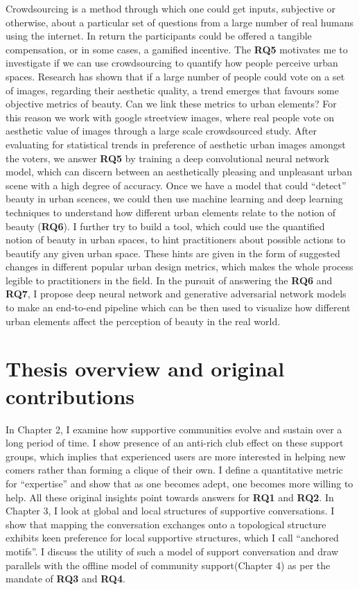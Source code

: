 Crowdsourcing is a method through which one could get inputs, subjective or otherwise, about a particular set of questions from a large number of real humans using the internet. In return the participants could be offered a tangible compensation, or in some cases, a gamified incentive. 
The \textbf{RQ5} motivates me to investigate if we can use crowdsourcing to quantify how people perceive urban spaces. Research has shown that if a large number of people could vote on a set of images, regarding their aesthetic quality, a trend emerges that favours some objective metrics of beauty\cite{datta2008algorithmic,612644,quercia2014aesthetic}. Can we link these metrics to urban elements? For this reason we work with google streetview images, where real people vote on aesthetic value of images through a large scale crowdsourced study. After evaluating for statistical trends in preference of aesthetic urban images amongst the voters, we answer \textbf{RQ5} by training a deep convolutional neural network model, which can discern between an aesthetically pleasing and unpleasant urban scene with a high degree of accuracy. Once we have a model that could ``detect'' beauty in urban scences, we could then use machine learning and deep learning techniques to understand how different urban elements relate to the notion of beauty (\textbf{RQ6}). I further try to build a tool, which could use the quantified notion of beauty in urban spaces, to hint practitioners about possible actions to beautify any given urban space. These hints are given in the form of suggested changes in different popular urban design metrics, which makes the whole process legible to practitioners in the field. In the pursuit of answering the \textbf{RQ6} and  \textbf{RQ7}, I propose deep neural network and generative adversarial network models to make an end-to-end pipeline which can be then used to visualize how different urban elements affect the perception of beauty in the real world.


\section{Thesis overview and original contributions}
In Chapter 2, I examine how supportive communities evolve and sustain over a long period of time. I show presence of an anti-rich club effect on these support groups, which implies that experienced users are more interested in helping new comers rather than forming a clique of their own. I define a quantitative metric for ``expertise'' and show that as one becomes adept, one becomes more willing to help. All these original insights point towards answers for \textbf{RQ1} and \textbf{RQ2}. In Chapter 3, I look at global and local structures of supportive conversations. I show that mapping the conversation exchanges onto a topological structure exhibits keen preference for local supportive structures, which I call ``anchored motifs''. I discuss the utility of such a model of support conversation and draw parallels with the offline model of community support(Chapter 4) as per the mandate of \textbf{RQ3} and \textbf{RQ4}. 

